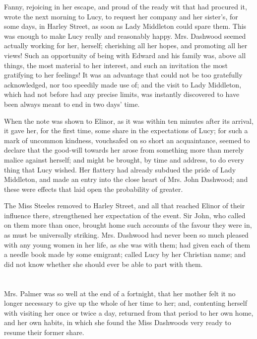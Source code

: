 Fanny, rejoicing in her escape, and proud of the ready wit that had procured it, wrote the next morning to Lucy, to request her company and her sister's, for some days, in Harley Street, as soon as Lady Middleton could spare them. This was enough to make Lucy really and reasonably happy. Mrs. Dashwood seemed actually working for her, herself; cherishing all her hopes, and promoting all her views! Such an opportunity of being with Edward and his family was, above all things, the most material to her interest, and such an invitation the most gratifying to her feelings! It was an advantage that could not be too gratefully acknowledged, nor too speedily made use of; and the visit to Lady Middleton, which had not before had any precise limits, was instantly discovered to have been always meant to end in two days' time.

When the note was shown to Elinor, as it was within ten minutes after its arrival, it gave her, for the first time, some share in the expectations of Lucy; for such a mark of uncommon kindness, vouchsafed on so short an acquaintance, seemed to declare that the good-will towards her arose from something more than merely malice against herself; and might be brought, by time and address, to do every thing that Lucy wished. Her flattery had already subdued the pride of Lady Middleton, and made an entry into the close heart of Mrs. John Dashwood; and these were effects that laid open the probability of greater.

The Miss Steeles removed to Harley Street, and all that reached Elinor of their influence there, strengthened her expectation of the event. Sir John, who called on them more than once, brought home such accounts of the favour they were in, as must be universally striking. Mrs. Dashwood had never been so much pleased with any young women in her life, as she was with them; had given each of them a needle book made by some emigrant; called Lucy by her Christian name; and did not know whether she should ever be able to part with them.

\chapter{} %

Mrs. Palmer was so well at the end of a fortnight, that her mother felt it no longer necessary to give up the whole of her time to her; and, contenting herself with visiting her once or twice a day, returned from that period to her own home, and her own habits, in which she found the Miss Dashwoods very ready to resume their former share.

